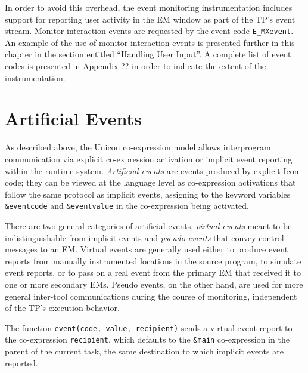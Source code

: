 In order to avoid this overhead, the event monitoring instrumentation
includes support for reporting user activity in the EM window as part
of the TP's event stream.
Monitor interaction events are requested by
the event code {\tt E\_MXevent}.  An example of the use of monitor
interaction events is presented further in this chapter in the section
entitled ``Handling User Input''.  A complete list of event codes
is presented in Appendix ?? in order to indicate the extent of the
instrumentation.


\section{Artificial Events}

As described above, the Unicon co-expression model allows
interprogram communication via explicit co-expression activation or
implicit event reporting within the runtime system.
{\em Artificial events\/} are events produced by explicit 
Icon code; they can be viewed at the language level as co-expression
activations that follow the same protocol as implicit events,
assigning to the keyword variables {\tt \&eventcode} and
{\tt \&eventvalue} in the co-expression being activated.

There are two general categories of artificial events, {\em virtual events\/}
meant to be indistinguishable from implicit events and {\em pseudo events\/}
that convey control messages to an EM.  Virtual events are generally
used either to produce event reports from manually instrumented
locations in the source program, to simulate event reports, or to pass
on a real event from the primary EM that received it to one or
more secondary EMs.  Pseudo events, on the other hand, are used for
more general inter-tool communications during the course of monitoring,
independent of the TP's execution behavior.

\vspace{1pc}


\vspace{0.25pc}
\noindent
The function {\tt event(code, value, recipient)} sends
a virtual event report to the co-expression {\tt recipient}, which
defaults to the {\tt \&main} co-expression in the parent of the
current task, the same destination to which implicit events are
reported.

